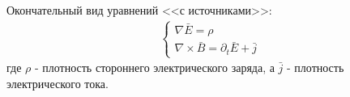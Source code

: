 \documentclass[__main__.tex]{subfiles}
\begin{document}
Окончательный вид уравнений <<с источниками>>:\\
\begin{gather}
    \label{P5-13}
    \begin{cases}
        \nabla\bar{E}=\rho \\
        \nabla\times\bar{B}=\partial_t\bar{E}+\bar{j}
    \end{cases}
\end{gather}
где $\rho$ - плотность стороннего электрического заряда, а $\bar{j}$ - плотность электрического тока.
\end{document}
